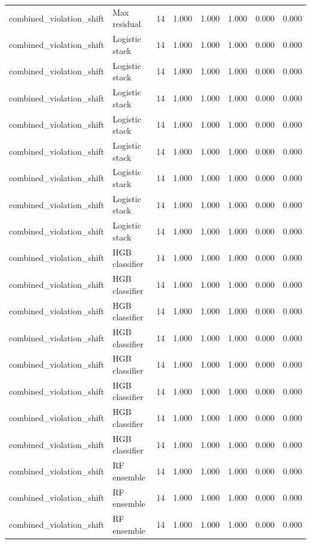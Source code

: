 {\begin{longtable}{llrrrrrr}
combined\_violation\_shift & Max residual & 14 & 1.000 & 1.000 & 1.000 & 0.000 & 0.000 \\
combined\_violation\_shift & Logistic stack & 14 & 1.000 & 1.000 & 1.000 & 0.000 & 0.000 \\
combined\_violation\_shift & Logistic stack & 14 & 1.000 & 1.000 & 1.000 & 0.000 & 0.000 \\
combined\_violation\_shift & Logistic stack & 14 & 1.000 & 1.000 & 1.000 & 0.000 & 0.000 \\
combined\_violation\_shift & Logistic stack & 14 & 1.000 & 1.000 & 1.000 & 0.000 & 0.000 \\
combined\_violation\_shift & Logistic stack & 14 & 1.000 & 1.000 & 1.000 & 0.000 & 0.000 \\
combined\_violation\_shift & Logistic stack & 14 & 1.000 & 1.000 & 1.000 & 0.000 & 0.000 \\
combined\_violation\_shift & Logistic stack & 14 & 1.000 & 1.000 & 1.000 & 0.000 & 0.000 \\
combined\_violation\_shift & Logistic stack & 14 & 1.000 & 1.000 & 1.000 & 0.000 & 0.000 \\
combined\_violation\_shift & HGB classifier & 14 & 1.000 & 1.000 & 1.000 & 0.000 & 0.000 \\
combined\_violation\_shift & HGB classifier & 14 & 1.000 & 1.000 & 1.000 & 0.000 & 0.000 \\
combined\_violation\_shift & HGB classifier & 14 & 1.000 & 1.000 & 1.000 & 0.000 & 0.000 \\
combined\_violation\_shift & HGB classifier & 14 & 1.000 & 1.000 & 1.000 & 0.000 & 0.000 \\
combined\_violation\_shift & HGB classifier & 14 & 1.000 & 1.000 & 1.000 & 0.000 & 0.000 \\
combined\_violation\_shift & HGB classifier & 14 & 1.000 & 1.000 & 1.000 & 0.000 & 0.000 \\
combined\_violation\_shift & HGB classifier & 14 & 1.000 & 1.000 & 1.000 & 0.000 & 0.000 \\
combined\_violation\_shift & HGB classifier & 14 & 1.000 & 1.000 & 1.000 & 0.000 & 0.000 \\
combined\_violation\_shift & RF ensemble & 14 & 1.000 & 1.000 & 1.000 & 0.000 & 0.000 \\
combined\_violation\_shift & RF ensemble & 14 & 1.000 & 1.000 & 1.000 & 0.000 & 0.000 \\
combined\_violation\_shift & RF ensemble & 14 & 1.000 & 1.000 & 1.000 & 0.000 & 0.000 \\

\end{longtable}}
